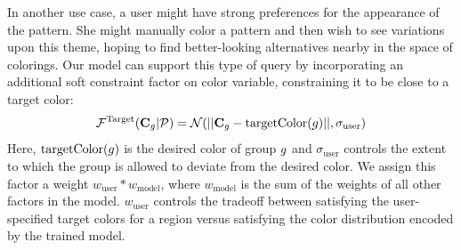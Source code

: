 In another use case, a user might have strong preferences for the appearance of the pattern. She might manually color a pattern and then wish to see variations upon this theme, hoping to find better-looking alternatives nearby in the space of colorings. Our model can support this type of query by incorporating an additional soft constraint factor on color variable, constraining it to be close to a target color:
\begin{equation}
\mathcal{F}^\textrm{Target}(\mathbf{C}_g | \mathcal{P}) = \mathcal{N}(||\mathbf{C}_g - \textrm{targetColor}(g)||, \sigma_\textrm{user})
\label{eq:targetFactor}
\end{equation}
Here, $\textrm{targetColor}(g)$ is the desired color of group $g$ and $\sigma_\textrm{user}$ controls the extent to which the group is allowed to deviate from the desired color. We assign this factor a weight $w_\textrm{user} * w_\textrm{model}$, where $w_\textrm{model}$ is the sum of the weights of all other factors in the model. $w_\textrm{user}$ controls the tradeoff between satisfying the user-specified target colors for a region versus satisfying the color distribution encoded by the trained model.
%



